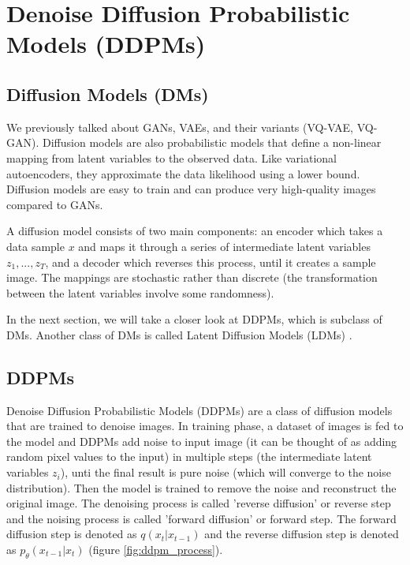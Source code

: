 \section{Denoise Diffusion Probabilistic Models (DDPMs)}


\subsection{Diffusion Models (DMs)}

We previously talked about GANs, VAEs, and their variants (VQ-VAE, VQ-GAN). Diffusion models are also probabilistic models that define a non-linear mapping from latent variables to the observed data. Like variational autoencoders, they approximate the data likelihood using a lower bound. Diffusion models are easy to train and can produce very high-quality images compared to GANs.

A diffusion model consists of two main components: an encoder which takes a data sample $x$ and maps it through a series of intermediate latent variables $z_1, ..., z_T$, and a decoder which reverses this process, until it creates a sample image. The mappings are stochastic rather than discrete (the transformation between the latent variables involve some randomness).

In the next section, we will take a closer look at DDPMs, which is subclass of DMs. Another class of DMs is called Latent Diffusion Models (LDMs) \cite{ldm}. 


\subsection{DDPMs}

Denoise Diffusion Probabilistic Models (DDPMs) \cite{ddpm} are a class of diffusion models that are trained to denoise images. In training phase, a dataset of images is fed to the model and DDPMs add noise to input image (it can be thought of as adding random pixel values to the input) in multiple steps (the intermediate latent variables $z_i$), unti the final result is pure noise (which will converge to the noise distribution). Then the model is trained to remove the noise and reconstruct the original image. The denoising process is called 'reverse diffusion' or reverse step and the noising process is called 'forward diffusion' or forward step. The forward diffusion step is denoted as $q(x_t | x_{t-1})$ and the reverse diffusion step is denoted as $p_\theta (x_{t-1} | x_t)$ (figure \ref{fig:ddpm_process}).


